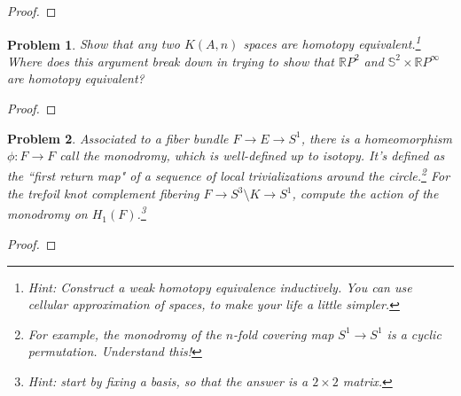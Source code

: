 \documentclass[11pt]{article}
\newtheorem{problem}{Problem}
\begin{document}
\begin{proof}

\end{proof} 


\pagebreak

\begin{problem}
Show that any two $K(A,n)$ spaces are homotopy equivalent.\footnote{Hint: Construct a weak homotopy equivalence inductively. You can use cellular approximation of spaces, to make your life a little simpler.} Where does this argument break down in trying to show that $\mathbb RP^2$ and $\mathbb S^2\times\mathbb RP^\infty$ are homotopy equivalent? 
\end{problem}

\begin{proof}

\end{proof}

\pagebreak

\begin{problem}
Associated to a fiber bundle $F\to E\to S^1$, there is a homeomorphism $\phi:F\to F$ call the monodromy, which is well-defined up to isotopy. It's defined as the ``first return map" of a sequence of local trivializations around the circle.\footnote{For example, the monodromy of the $n$-fold covering map $S^1\to S^1$ is a cyclic permutation. Understand this!} For the trefoil knot complement fibering $F\to S^3\setminus K\to S^1$, compute the action of  the monodromy on $H_1(F)$.\footnote{Hint: start by fixing a basis, so that the answer is a $2\times 2$ matrix.} 
\end{problem}


\begin{proof}

\end{proof}
\end{document}
